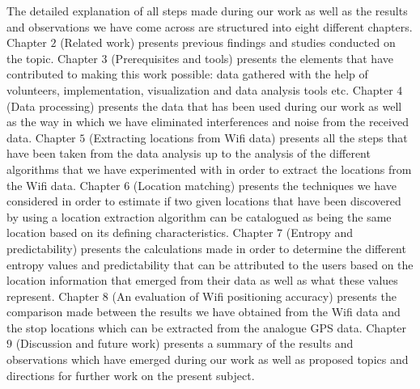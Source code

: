 The detailed explanation of all steps made during our work as well as the
results and observations we have come across are structured into eight different
chapters. Chapter $2$ (Related work) presents previous findings and studies
conducted on the topic. Chapter $3$ (Prerequisites and tools) presents the
elements that have contributed to making this work possible: data gathered with
the help of volunteers, implementation, visualization and data analysis tools
etc. Chapter $4$ (Data processing) presents the data that has been used during
our work as well as the way in which we have eliminated interferences and noise
from the received data. Chapter $5$ (Extracting locations from Wifi data)
presents all the steps that have been taken from the data analysis up to the
analysis of the different algorithms that we have experimented with in order to
extract the locations from the Wifi data. Chapter $6$ (Location matching)
presents the techniques we have considered in order to estimate if two given
locations that have been discovered by using a location extraction algorithm can
be catalogued as being the same location based on its defining characteristics.
Chapter $7$ (Entropy and predictability) presents the calculations made in order
to determine the different entropy values and predictability that can be
attributed to the users based on the location information that emerged from
their data as well as what these values represent. Chapter $8$ (An evaluation
of Wifi positioning accuracy) presents the comparison made between the results
we have obtained from the Wifi data and the stop locations which can be
extracted from the analogue GPS data. Chapter $9$ (Discussion and future work)
presents a summary of the results and observations which have emerged during
our work as well as proposed topics and directions for further work on the
present subject.
